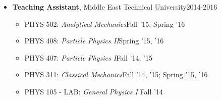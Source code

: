 \documentclass[a4paper,11pt]{article}
\begin{document}
\begin{itemize}[noitemsep,nolistsep]
\begin{itemize}
		\item[] PHYS 181: \emph{University Physics}\hfill Spring '18, '20, '21\hspace*{2.2em}\vspace*{-.3em}
		\item[] PHYS 180: \emph{University Physics}\hfill Fall '17, '19, '20; Summer '20\hspace*{2.2em}\vspace*{-.3em}
		\item[] PHYS 166L: \emph{General Physics Laboratory}\hfill Spring '17\hspace*{2.2em}\vspace*{-.3em}
	\end{itemize} 
	\item[] \textbf{Teaching Assistant}, Middle East Technical University\hfill 2014-2016
	\vspace*{-.3em}
	\begin{itemize}
	\item[] PHYS 502: \emph{Analytical Mechanics}\hfill Fall '15; Spring '16\hspace*{2.2em}\vspace*{-.3em}
	\item[] PHYS 408: \emph{Particle Physics II}\hfill Spring '15, '16\hspace*{2.2em}\vspace*{-.3em}
	\item[] PHYS 407: \emph{Particle Physics I}\hfill Fall '14, '15\hspace*{2.2em}\vspace*{-.3em}
	\item[] PHYS 311: \emph{Classical Mechanics}\hfill Fall '14, '15; Spring '15, '16\hspace*{2.2em}\vspace*{-.3em}
	\item[] PHYS 105 - LAB: \emph{General Physics I} \hfill Fall '14\hspace*{2.2em}\vspace*{-.3em}
	\end{itemize}
\end{itemize}
\end{document}
